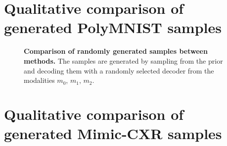\chapter{Qualitative comparison of generated PolyMNIST samples} \label{chap:gen ex polymnist}
%


\begin{figure}[h!]
    \centering
    \caption{\textbf{Comparison of randomly generated samples between methods.} The samples are generated by sampling from the prior and decoding them with a randomly selected decoder from the modalities $m_0$, $m_1$, $m_2$.
    }
    \label{fig:rand gen polymnist}
\end{figure}

\chapter{Qualitative comparison of generated Mimic-CXR samples}
%